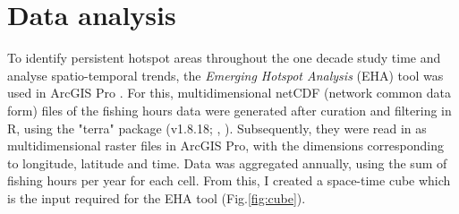 \section{Data analysis}
To identify persistent hotspot areas throughout the one decade study time and analyse spatio-temporal trends, the \textit{Emerging Hotspot Analysis} (EHA) tool
was used in ArcGIS Pro \citep{arcgis}. For this, multidimensional netCDF (network common data form) files of the fishing hours data were generated after curation and filtering in R, using
the "terra" package (v1.8.18; \citeauthor{terra_package}, \citeyear{terra_package}). Subsequently, they were read in as multidimensional raster files in ArcGIS Pro, with the
dimensions corresponding to longitude, latitude and time. Data was aggregated annually, using the sum of fishing hours per year for each cell.
From this, I created a space-time cube which is the input required for the EHA tool (Fig.\ref{fig:cube}).

